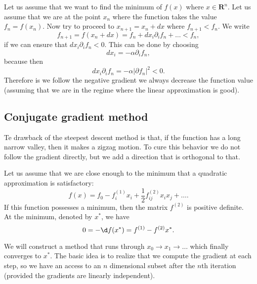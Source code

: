 \documentclass[10pt,a4paper]{article}
\begin{document}
Let us assume that we want to find the minimum of $f(x)$ where $x\in\textbf{R}^n$. Let us assume that we are at the point $x_n$ where the function takes the value $f_n=f(x_n)$. Now try to proceed to $x_{n+1}=x_n+dx$ where $f_{n+1}<f_n$. We write
\begin{equation}
f_{n+1}=f(x_n+dx) = f_n + dx_i \partial_i f_n + \dots < f_n,
\end{equation}
if we can ensure that $dx_i \partial_i f_n<0$. This can be done by choosing\begin{equation}
dx_i =-\alpha \partial_i f_n,
\end{equation}
because then
\begin{equation}
dx_i \partial_i f_n = -\alpha |\partial f_n|^2 <0.
\end{equation}
Therefore is we follow the negative gradient we always decrease the function value (assuming that we are in the regime where the linear approximation is good).

\subsection{Conjugate gradient method}

Te drawback of the steepest descent method is that, if the function has a long narrow valley, then it makes a zigzag motion. To cure this behavior we do not follow the gradient directly, but we add a direction that is orthogonal to that.

Let us assume that we are close enough to the minimum that a quadratic approximation is satisfactory:\begin{equation}
f(x) = f_0 - f^{(1)}_i x_i + \dfrac{1}{2} f^{(2)}_{ij} x_ix_j+\dots.
\end{equation}
If this function possesses a minimum, then the matrix $f^{(2)}$ is positive definite. At the minimum, denoted by $x^*$, we have
\begin{equation}
0=-\d f(x^*)=f^{(1)}- f^{(2)} x^*.
\end{equation}

We will construct a method that runs through $x_0\to x_1\to\dots $ which finally converges to $x^*$. The basic idea is to realize that we compute the gradient at each step, so we have an access to an $n$ dimensional subset after the $n$th iteration (provided the gradients are linearly independent).
\end{document}
